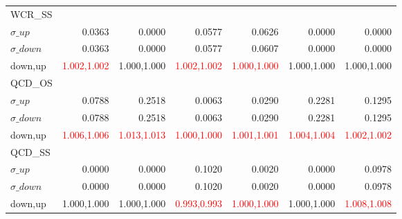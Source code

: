 \documentclass[11pt,oneside,a4paper]{article}
\begin{document}
\begin{table}
\begin{tabular}{lrrrrrr}
\hline
WCR\_SS &  &  &  &  &  &  \\
$\sigma\_up$ & 0.0363 & 0.0000 & 0.0577 & 0.0626 & 0.0000 & 0.0000 \\
$\sigma\_down$ & 0.0363 & 0.0000 & 0.0577 & 0.0607 & 0.0000 & 0.0000 \\
down,up & \textcolor{red}{1.002,1.002} & 1.000,1.000 & \textcolor{red}{1.002,1.002} & \textcolor{red}{1.000,1.000} & 1.000,1.000 & 1.000,1.000 \\

\hline
QCD\_OS &  &  &  &  &  &  \\
$\sigma\_up$ & 0.0788 & 0.2518 & 0.0063 & 0.0290 & 0.2281 & 0.1295 \\
$\sigma\_down$ & 0.0788 & 0.2518 & 0.0063 & 0.0290 & 0.2281 & 0.1295 \\
down,up & \textcolor{red}{1.006,1.006} & \textcolor{red}{1.013,1.013} & \textcolor{red}{1.000,1.000} & \textcolor{red}{1.001,1.001} & \textcolor{red}{1.004,1.004} & \textcolor{red}{1.002,1.002} \\

\hline
QCD\_SS &  &  &  &  &  &  \\
$\sigma\_up$ & 0.0000 & 0.0000 & 0.1020 & 0.0020 & 0.0000 & 0.0978 \\
$\sigma\_down$ & 0.0000 & 0.0000 & 0.1020 & 0.0020 & 0.0000 & 0.0978 \\
down,up & 1.000,1.000 & 1.000,1.000 & \textcolor{red}{0.993,0.993} & \textcolor{red}{1.000,1.000} & 1.000,1.000 & \textcolor{red}{1.008,1.008} \\

\hline
\end{tabular}
\end{table}
\end{document}
